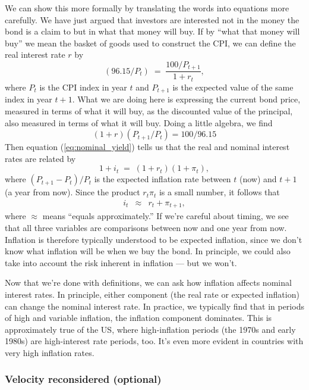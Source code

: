 \documentclass[letterpaper,12pt]{article}
\begin{document}
We can show this more formally
by translating the words into equations more carefully.
We have just argued that investors are interested not in the money the
bond is a claim to but in what that money will buy. If by ``what
that money will buy'' we mean the basket of goods used to construct
the CPI, we can define the real interest rate $r$ by
%
\[
    (96.15/P_t) \;=\; \frac{100/ P_{t+1}}{1+r_t},
\]
%
where $P_{t}$ is the CPI index in year $t$ and $P_{t+1}$ is the
expected value of the same index in year $t+1$. What we are doing
here is expressing the current bond price, measured in terms of what
it will buy, as the discounted value of the principal, also measured
in terms of what it will buy. Doing a little algebra, we find
%
\begin{equation*}
    (1+r)(P_{t+1}/P_{t})=100/96.15
\end{equation*}
%
Then equation (\ref{eq:nominal_yield}) tells us that the real and
nominal interest rates are related by
\[
    1 + i_t \;=\; (1+r_t)(1+\pi_{t}),
\]
where $(P_{t+1}-P_t)/P_t $ is the expected inflation rate between
$t$ (now) and $t+1$ (a year from now). Since the product
$r_{t}\pi_{t}$ is a small number, it follows that
\begin{eqnarray*}
    i_t  &\approx&  r_t + \pi_{t+1} ,
\end{eqnarray*}
where $\approx$ means ``equals approximately.''
If we're careful about timing, we see that all three variables
are comparisons between now and one year from now.
Inflation is therefore typically understood to be
expected inflation, since we don't know what inflation 
will be when we buy the bond.
In principle, we could also take into account the risk
inherent in inflation --- but we won't.


Now that we're done with definitions, we can ask how inflation
affects nominal interest rates.
In principle, either component (the real rate or expected inflation)
can change the nominal interest rate.
In practice, we typically find that in periods of
high and variable inflation,
the inflation component dominates.
This is approximately true of the US, where high-inflation periods
(the 1970s and early 1980s)
are high-interest rate periods, too.
It's even more evident in countries with very high inflation rates.


\subsubsection*{Velocity reconsidered (optional)}
\end{document}
